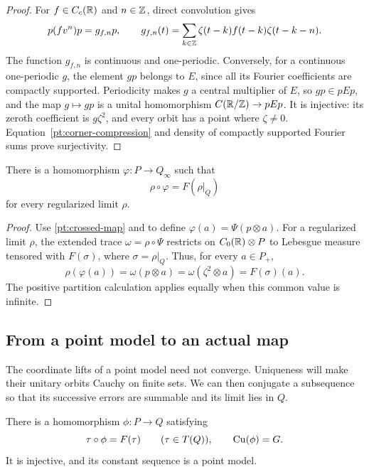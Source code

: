 \begin{proof}
For \(f\in C_c(\mathbb R)\) and \(n\in\mathbb Z\), direct convolution
gives
\begin{equation}\label{pt:corner-compression}
 p(fv^n)p=g_{f,n}p,\qquad
 g_{f,n}(t)=\sum_{k\in\mathbb Z}
       \zeta(t-k)f(t-k)\zeta(t-k-n).
\end{equation}
The function \(g_{f,n}\) is continuous and one-periodic.
Conversely, for a continuous one-periodic \(g\), the
element \(gp\) belongs to \(E\), since all its Fourier
coefficients are compactly supported. Periodicity makes \(g\)
a central multiplier of \(E\), so \(gp\in pEp\), and the map
\(g\mapsto gp\) is a unital homomorphism
\(C(\mathbb R/\mathbb Z)\to pEp\).  It is injective: its zeroth
coefficient is \(g\zeta^2\), and every orbit has a
point where \(\zeta\ne0\).
Equation~\eqref{pt:corner-compression} and density of
compactly supported Fourier sums prove surjectivity.
\end{proof}

\begin{corollary}\label{pt:point-model}
There is a homomorphism \(\varphi:P\to Q_\infty\) such that
\[
 \rho\circ\varphi=F(\rho|_Q)
\]
for every regularized limit \(\rho\).
\end{corollary}

\begin{proof}
Use \eqref{pt:crossed-map} and  to define
\(\varphi(a)=\Psi(p\otimes a)\).
For a regularized limit \(\rho\), the extended trace
\(\omega=\rho\circ\Psi\) restricts on
\(C_0(\mathbb R)\otimes P\) to Lebesgue measure tensored with
\(F(\sigma)\), where \(\sigma=\rho|_Q\).
Thus, for every \(a\in P_+\),
\[
 \rho(\varphi(a))
 =\omega(p\otimes a)
 =\omega(\zeta^2\otimes a)
 =F(\sigma)(a).
\]
The positive partition calculation applies equally when
this common value is infinite.
\end{proof}

\subsection{From a point model to an actual map}

The coordinate lifts of a point model need not converge.
Uniqueness will make their unitary orbits Cauchy on finite sets.
We can then conjugate a subsequence so that its successive
errors are summable and its limit lies in \(Q\).

\begin{proposition}\label{pt:actual-map}
There is a homomorphism \(\phi:P\to Q\) satisfying
\[
 \tau\circ\phi=F(\tau)\qquad(\tau\in T(Q)),
 \qquad \operatorname{Cu}(\phi)=G.
\]
It is injective, and its constant sequence is a point model.
\end{proposition}

